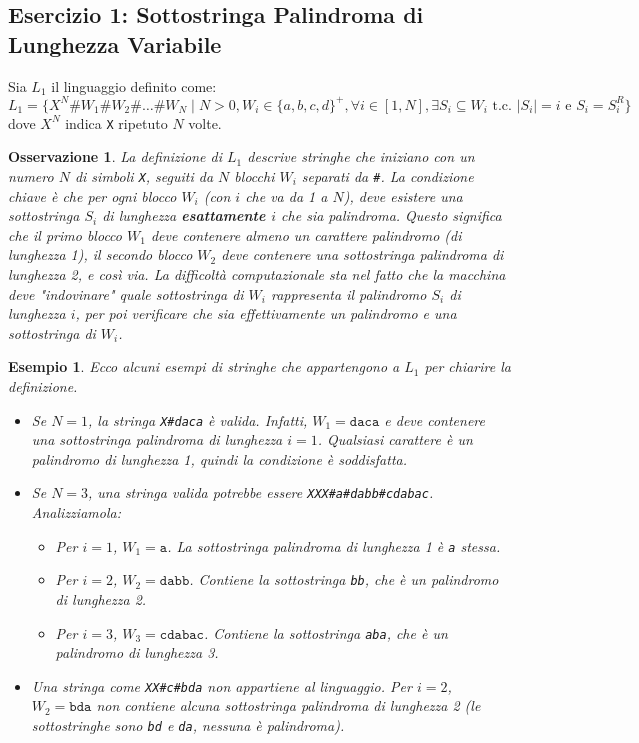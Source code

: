 \documentclass[a4paper]{article}
\newtheorem{example}{Esempio}
\newtheorem{remark}{Osservazione}
\newcommand{\Sh}{\texttt{\#}} %
\begin{document}
\subsection{Esercizio 1: Sottostringa Palindroma di Lunghezza Variabile}

Sia $L_1$ il linguaggio definito come:
\[
L_1 = \{ X^N \Sh W_1 \Sh W_2 \Sh \dots \Sh W_N \mid N > 0, W_i \in \{a,b,c,d\}^+, \forall i \in [1, N], \exists S_i \subseteq W_i \text{ t.c. } |S_i| = i \text{ e } S_i = S_i^R \}
\]
dove $X^N$ indica \texttt{X} ripetuto $N$ volte.

\begin{remark}
La definizione di $L_1$ descrive stringhe che iniziano con un numero $N$ di simboli \texttt{X}, seguiti da $N$ blocchi $W_i$ separati da \texttt{\#}. La condizione chiave è che per ogni blocco $W_i$ (con $i$ che va da 1 a $N$), deve esistere una sottostringa $S_i$ di lunghezza \textbf{esattamente $i$} che sia palindroma. Questo significa che il primo blocco $W_1$ deve contenere almeno un carattere palindromo (di lunghezza 1), il secondo blocco $W_2$ deve contenere una sottostringa palindroma di lunghezza 2, e così via. La difficoltà computazionale sta nel fatto che la macchina deve "indovinare" quale sottostringa di $W_i$ rappresenta il palindromo $S_i$ di lunghezza $i$, per poi verificare che sia effettivamente un palindromo e una sottostringa di $W_i$.
\end{remark}

\begin{example}
Ecco alcuni esempi di stringhe che appartengono a $L_1$ per chiarire la definizione.
\begin{itemize}
    \item Se $N=1$, la stringa \texttt{X\#daca} è valida. Infatti, $W_1 = \texttt{daca}$ e deve contenere una sottostringa palindroma di lunghezza $i=1$. Qualsiasi carattere è un palindromo di lunghezza 1, quindi la condizione è soddisfatta.
    \item Se $N=3$, una stringa valida potrebbe essere \texttt{XXX\#a\#dabb\#cdabac}. Analizziamola:
    \begin{itemize}
        \item Per $i=1$, $W_1 = \texttt{a}$. La sottostringa palindroma di lunghezza 1 è \texttt{a} stessa.
        \item Per $i=2$, $W_2 = \texttt{dabb}$. Contiene la sottostringa \texttt{bb}, che è un palindromo di lunghezza 2.
        \item Per $i=3$, $W_3 = \texttt{cdabac}$. Contiene la sottostringa \texttt{aba}, che è un palindromo di lunghezza 3.
    \end{itemize}
    \item Una stringa come \texttt{XX\#c\#bda} non appartiene al linguaggio. Per $i=2$, $W_2 = \texttt{bda}$ non contiene alcuna sottostringa palindroma di lunghezza 2 (le sottostringhe sono \texttt{bd} e \texttt{da}, nessuna è palindroma).
\end{itemize}
\end{example}
\end{document}
